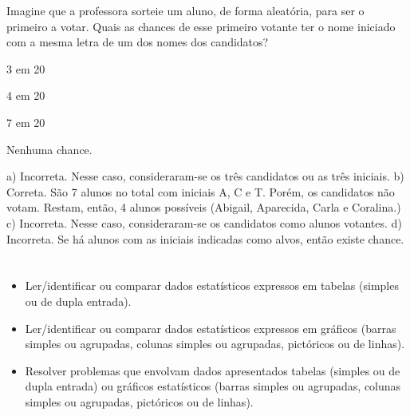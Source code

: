 \begin{escolha}
{\begin{escolha}
Imagine que a professora sorteie um aluno, de forma aleatória, para ser o primeiro a votar. Quais as chances de esse primeiro votante ter o nome iniciado com a mesma letra de um dos nomes dos candidatos?


\begin{escolha}
\item
3 em 20
\item
4 em 20
\item
7 em 20
\item
Nenhuma chance.
\end{escolha}

a) Incorreta. Nesse caso, consideraram-se os três candidatos ou as três iniciais.
b) Correta. São 7 alunos no total com iniciais A, C e T. Porém, os candidatos não votam. Restam, então, 4 alunos possíveis (Abigail, Aparecida, Carla e Coralina.)
c) Incorreta. Nesse caso, consideraram-se os candidatos como alunos votantes.
d) Incorreta. Se há alunos com as iniciais indicadas como alvos, então existe chance.

\chapter{}


\begin{itemize}
    \item Ler/identificar ou comparar dados estatísticos expressos em tabelas
(simples ou de dupla entrada).

    \item Ler/identificar ou comparar dados estatísticos expressos em gráficos
(barras simples ou agrupadas, colunas simples ou agrupadas, pictóricos
ou de linhas).

    \item Resolver problemas que envolvam dados apresentados tabelas (simples ou
de dupla entrada) ou gráficos estatísticos (barras simples ou agrupadas,
colunas simples ou agrupadas, pictóricos ou de linhas).
\end{itemize}


\end{escolha}}
\end{escolha}
